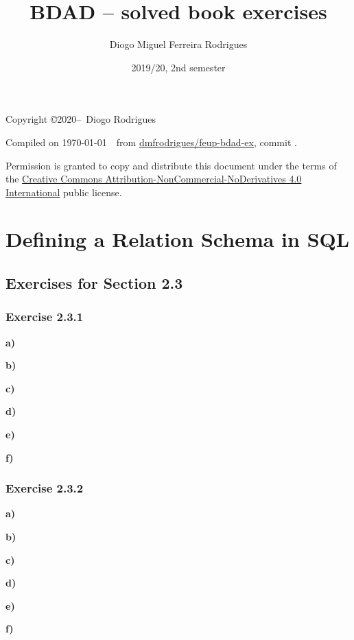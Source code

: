 \documentclass{bdad}
\title{BDAD -- solved book exercises}
\author{Diogo Miguel Ferreira Rodrigues  \\ \email{dmfrodrigues2000@gmail.com}}
\date{2019/20, 2nd semester}
\begin{document}
\maketitle
\begin{secondpage}
    Copyright \copyright 2020--\the\year\ Diogo Rodrigues\par
    \par
    \immediate{}
    Compiled on \today~\currenttime~from \href{https://github.com/dmfrodrigues/feup-bdad-ex}{dmfrodrigues/feup-bdad-ex}, commit \unskip.\par
    Permission is granted to copy and distribute this document under the terms of the 
    \href{https://creativecommons.org/licenses/by-nc-nd/4.0/}{Creative Commons Attribution-NonCommercial-NoDerivatives 4.0 International}
    public license.
\end{secondpage}
\frontmatter
\tableofcontents
\mainmatter

\setcounter{chapter}{2}
\setcounter{section}{2}
\section{Defining a Relation Schema in SQL}
\subsection{Exercises for Section 2.3}
\subsubsection{Exercise 2.3.1}
\textbf{a)}

\textbf{b)}

\textbf{c)}

\textbf{d)}

\textbf{e)}

\textbf{f)}


\newpage
\subsubsection{Exercise 2.3.2}
\textbf{a)}

\textbf{b)}

\textbf{c)}

\textbf{d)}

\textbf{e)}

\textbf{f)}

\end{document}
